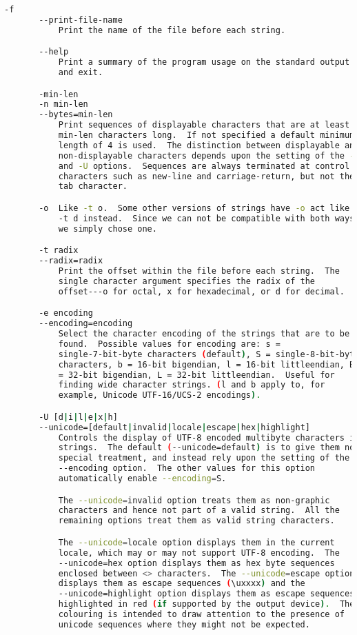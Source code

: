 {{\begin{lstlisting}[language=bash]
       -f
       --print-file-name
           Print the name of the file before each string.

       --help
           Print a summary of the program usage on the standard output
           and exit.

       -min-len
       -n min-len
       --bytes=min-len
           Print sequences of displayable characters that are at least
           min-len characters long.  If not specified a default minimum
           length of 4 is used.  The distinction between displayable and
           non-displayable characters depends upon the setting of the -e
           and -U options.  Sequences are always terminated at control
           characters such as new-line and carriage-return, but not the
           tab character.

       -o  Like -t o.  Some other versions of strings have -o act like
           -t d instead.  Since we can not be compatible with both ways,
           we simply chose one.

       -t radix
       --radix=radix
           Print the offset within the file before each string.  The
           single character argument specifies the radix of the
           offset---o for octal, x for hexadecimal, or d for decimal.

       -e encoding
       --encoding=encoding
           Select the character encoding of the strings that are to be
           found.  Possible values for encoding are: s =
           single-7-bit-byte characters (default), S = single-8-bit-byte
           characters, b = 16-bit bigendian, l = 16-bit littleendian, B
           = 32-bit bigendian, L = 32-bit littleendian.  Useful for
           finding wide character strings. (l and b apply to, for
           example, Unicode UTF-16/UCS-2 encodings).

       -U [d|i|l|e|x|h]
       --unicode=[default|invalid|locale|escape|hex|highlight]
           Controls the display of UTF-8 encoded multibyte characters in
           strings.  The default (--unicode=default) is to give them no
           special treatment, and instead rely upon the setting of the
           --encoding option.  The other values for this option
           automatically enable --encoding=S.

           The --unicode=invalid option treats them as non-graphic
           characters and hence not part of a valid string.  All the
           remaining options treat them as valid string characters.

           The --unicode=locale option displays them in the current
           locale, which may or may not support UTF-8 encoding.  The
           --unicode=hex option displays them as hex byte sequences
           enclosed between <> characters.  The --unicode=escape option
           displays them as escape sequences (\uxxxx) and the
           --unicode=highlight option displays them as escape sequences
           highlighted in red (if supported by the output device).  The
           colouring is intended to draw attention to the presence of
           unicode sequences where they might not be expected.


\end{lstlisting}}}
